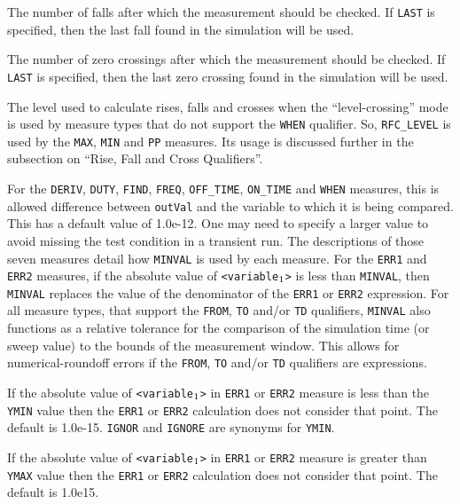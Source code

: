 \begin{Command}
\begin{Arguments}
The number of falls after which the measurement should be checked.  If
\texttt{LAST} is specified, then the last fall found in the simulation
will be used.


The number of zero crossings after which the measurement should be
checked.  If \texttt{LAST} is specified, then the last zero crossing
found in the simulation will be used.


The level used to calculate rises, falls and crosses when the
``level-crossing'' mode is used by measure types that do not support
the {\tt WHEN} qualifier.  So, {\tt RFC\_LEVEL} is used by the
{\tt MAX}, {\tt MIN} and {\tt PP} measures.  Its usage is discussed
further in the subsection on ``Rise, Fall and Cross Qualifiers''.


For the {\tt DERIV}, {\tt DUTY}, {\tt FIND}, {\tt FREQ}, {\tt OFF\_TIME},
{\tt ON\_TIME} and {\tt WHEN} measures, this is allowed difference between
\texttt{outVal} and the variable to  which it is being compared.  This has
a default value of 1.0e-12.  One may need to specify a larger value to avoid
missing the test condition in a transient run.  The descriptions of those
seven measures detail how {\tt MINVAL} is used by each measure.  For the
{\tt ERR1} and {\tt ERR2} measures, if the absolute value of
{\tt <variable\(\sb{1}\)>} is less than {\tt MINVAL}, then {\tt MINVAL} replaces
the value of the denominator of the {\tt ERR1} or {\tt ERR2} expression. For
all measure types, that support the {\tt FROM}, {\tt TO} and/or {\tt TD}
qualifiers, {\tt MINVAL} also functions as a relative tolerance for the
comparison of the simulation time (or sweep value) to the bounds of the
measurement window. This allows for numerical-roundoff errors if the
{\tt FROM}, {\tt TO} and/or {\tt TD} qualifiers are expressions.


If the absolute value of {\tt <variable\(\sb{1}\)>} in {\tt ERR1} or
{\tt ERR2} measure is less than the {\tt YMIN} value then the {\tt ERR1} or
{\tt ERR2} calculation does not consider that point. The default is 1.0e-15.
{\tt IGNOR} and {\tt IGNORE} are synonyms for {\tt YMIN}.


If the absolute value of {\tt <variable\(\sb{1}\)>} in {\tt ERR1} or
{\tt ERR2} measure is greater than {\tt YMAX} value then the {\tt ERR1} or
{\tt ERR2} calculation does not consider that point. The default is 1.0e15.


\end{Arguments}
\end{Command}
